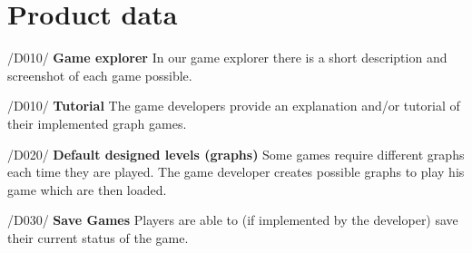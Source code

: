 \section{Product data}

/D010/ \textbf{Game explorer}
In our game explorer there is a short description and screenshot of each game possible.

/D010/ \textbf{Tutorial}
The game developers provide an explanation and/or tutorial of their implemented graph games.

/D020/ \textbf{Default designed levels (graphs)}
Some games require different graphs each time they are played. The game developer creates possible graphs to play his game which are then loaded.

/D030/ \textbf{Save Games}
Players are able to (if implemented by the developer) save their current status of the game.